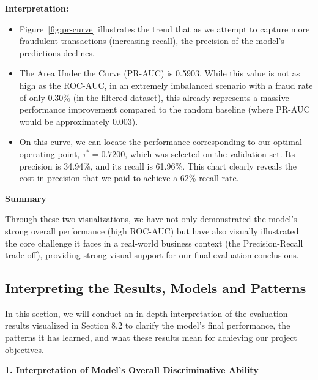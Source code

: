 \documentclass[sigplan,screen]{acmart}
\begin{document}
\textbf{Interpretation:}

\begin{itemize}
\item Figure~\ref{fig:pr-curve} illustrates the trend that as we attempt to capture more fraudulent transactions (increasing recall), the precision of the model's predictions declines.
\item The Area Under the Curve (PR-AUC) is 0.5903. While this value is not as high as the ROC-AUC, in an extremely imbalanced scenario with a fraud rate of only 0.30\% (in the filtered dataset), this already represents a massive performance improvement compared to the random baseline (where PR-AUC would be approximately 0.003).
\item On this curve, we can locate the performance corresponding to our optimal operating point, $\tau^* = 0.7200$, which was selected on the validation set. Its precision is 34.94\%, and its recall is 61.96\%. This chart clearly reveals the cost in precision that we paid to achieve a 62\% recall rate.
\end{itemize}

\textbf{Summary}

Through these two visualizations, we have not only demonstrated the model's strong overall performance (high ROC-AUC) but have also visually illustrated the core challenge it faces in a real-world business context (the Precision-Recall trade-off), providing strong visual support for our final evaluation conclusions.

\subsection{Interpreting the Results, Models and Patterns}

In this section, we will conduct an in-depth interpretation of the evaluation results visualized in Section 8.2 to clarify the model's final performance, the patterns it has learned, and what these results mean for achieving our project objectives.

\textbf{1. Interpretation of Model's Overall Discriminative Ability}
\end{document}
